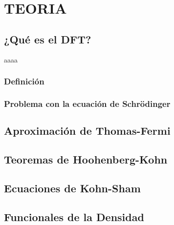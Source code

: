\chapter{TEORIA}

\section{¿Qué es el DFT?}

aaaa 
 

\subsection{Definición}

\subsection{Problema con la ecuación de Schrödinger}

\section{Aproximación de Thomas-Fermi}

\section{Teoremas de Hoohenberg-Kohn}   

\section{Ecuaciones de Kohn-Sham}

\section{Funcionales de la Densidad}